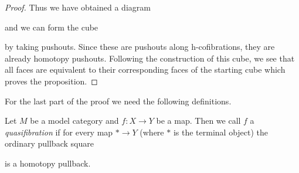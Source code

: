 \begin{prop}
\begin{proof}
        Thus we have obtained a diagram
        \begin{center}
        \end{center}
        and we can form the cube 
        \begin{center}
        \end{center}
        by taking pushouts.
        Since these are pushouts along h-cofibrations, they are already homotopy pushouts. 
        Following the construction of this cube, we see that all faces are equivalent to their corresponding faces of the starting cube which proves the proposition.
    \end{proof}
\end{prop}
For the last part of the proof we need the following definitions.
\begin{definition}
    Let $M$ be a model category and $f\colon X\to Y$ be a map.
    Then we call $f$ a \emph{quasifibration} if for every map $*\to Y$ (where $*$ is the terminal object) the ordinary pullback square
    \begin{center}
    \end{center}
    is a homotopy pullback.
\end{definition}
